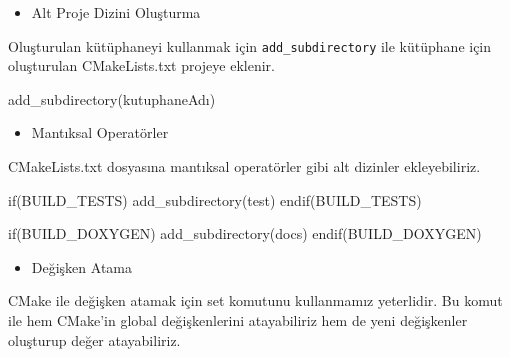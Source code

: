 \documentclass[
]{book}
\newenvironment{Shaded}{\begin{snugshade}}{\end{snugshade}}
\newcommand{\BuiltInTok}[1]{#1}
\newcommand{\ExtensionTok}[1]{#1}
\newcommand{\KeywordTok}[1]{\textcolor[rgb]{0.13,0.29,0.53}{\textbf{#1}}}
\newcommand{\NormalTok}[1]{#1}
\newcommand{\OperatorTok}[1]{\textcolor[rgb]{0.81,0.36,0.00}{\textbf{#1}}}
\newcommand{\VariableTok}[1]{\textcolor[rgb]{0.00,0.00,0.00}{#1}}
\providecommand{\tightlist}{%
  \setlength{\itemsep}{0pt}\setlength{\parskip}{0pt}}
\begin{document}
\begin{itemize}
\tightlist
\item
  Alt Proje Dizini Oluşturma
\end{itemize}

Oluşturulan kütüphaneyi kullanmak için \texttt{add\_subdirectory} ile kütüphane için oluşturulan CMakeLists.txt projeye eklenir.

\begin{Shaded}
\begin{Highlighting}[]
   \ExtensionTok{add\_subdirectory}\NormalTok{(kutuphaneAdı)}
\end{Highlighting}
\end{Shaded}

\begin{itemize}
\tightlist
\item
  Mantıksal Operatörler
\end{itemize}

CMakeLists.txt dosyasına mantıksal operatörler gibi alt dizinler ekleyebiliriz.

\begin{Shaded}
\begin{Highlighting}[]
  \ExtensionTok{if}\NormalTok{(BUILD\_TESTS)}
    \ExtensionTok{add\_subdirectory}\NormalTok{(test)}
  \ExtensionTok{endif}\NormalTok{(BUILD\_TESTS)}

  \ExtensionTok{if}\NormalTok{(BUILD\_DOXYGEN)}
    \ExtensionTok{add\_subdirectory}\NormalTok{(docs)}
  \ExtensionTok{endif}\NormalTok{(BUILD\_DOXYGEN)}
\end{Highlighting}
\end{Shaded}

\begin{itemize}
\tightlist
\item
  Değişken Atama
\end{itemize}

CMake ile değişken atamak için set komutunu kullanmamız yeterlidir. Bu komut ile hem CMake'in global değişkenlerini atayabiliriz hem de yeni değişkenler oluşturup değer atayabiliriz.

\begin{Shaded}
\end{Shaded}
\end{document}
